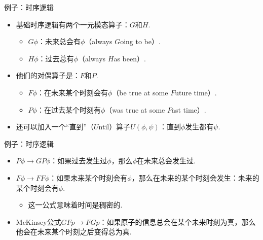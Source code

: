     \begin{frame}{例子：时序逻辑}
    \begin{itemize}
        \item 基础时序逻辑有两个一元模态算子：$G$和$H$.
        \begin{itemize}
            \item $G\phi$：未来总会有$\phi$（always $G$oing to be）.
        \item $H\phi$：过去总有$\phi$（always $H$as been）.
        \end{itemize}
        \item 他们的对偶算子是：$F$和$P$.
        \begin{itemize}
             \item $F\phi$：在未来某个时刻会有$\phi$（be true at some $F$uture time）.
        \item $P\phi$：在过去某个时刻有$\phi$（was true at some $P$ast time）.
        \end{itemize}
        \item 还可以加入一个“直到”（$U$ntil）算子$U(\phi,\psi)$：直到$\phi$发生都有$\psi$.
    \end{itemize}
    \end{frame}
    
    \begin{frame}{例子：时序逻辑}
    \begin{itemize}
        \item $P\phi\to GP\phi$：如果过去发生过$\phi$，那么$\phi$在未来总会发生过.
        \item $F\phi\to FF\phi$：如果未来某个时刻会有$\phi$，那么在未来的某个时刻会发生：未来的某个时刻会有$\phi$.
        \begin{itemize}
            \item 这一公式意味着时间是稠密的.
        \end{itemize}
        \item McKinsey公式$GF p\to FG p$：如果原子的信息总会在某个未来时刻为真，那么他会在未来某个时刻之后变得总为真.
    \end{itemize}
    \end{frame}
    
